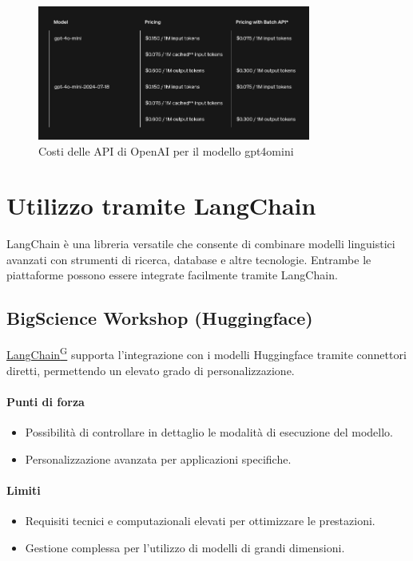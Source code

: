 \documentclass{article}
\begin{document}
\begin{figure}[H]
    \centering
    \includegraphics[width=0.8\textwidth]{img/costi_gpt4omini.png}
    \caption{Costi delle API di OpenAI per il modello gpt4omini}
    \label{fig:costi_openai_gpt4omini}
\end{figure}




\section{Utilizzo tramite LangChain}
LangChain è una libreria versatile che consente di combinare modelli linguistici avanzati con strumenti di ricerca, database e altre tecnologie. Entrambe le piattaforme possono essere integrate facilmente tramite LangChain.

\subsection{BigScience Workshop (Huggingface)}
\href{https://code7crusaders.github.io/docs/RTB/documentazione_interna/glossario.html#langchain}{LangChain\textsuperscript{G}} supporta l'integrazione con i modelli Huggingface tramite connettori diretti, permettendo un elevato grado di personalizzazione.

\paragraph*{Punti di forza}
\begin{itemize}
    \item Possibilità di controllare in dettaglio le modalità di esecuzione del modello.
    \item Personalizzazione avanzata per applicazioni specifiche.
\end{itemize}

\paragraph*{Limiti}
\begin{itemize}
    \item Requisiti tecnici e computazionali elevati per ottimizzare le prestazioni.
    \item Gestione complessa per l'utilizzo di modelli di grandi dimensioni.
\end{itemize}
\end{document}
